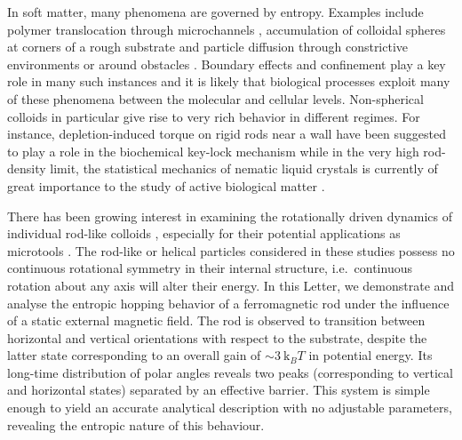 \documentclass[aps,prl,reprint,twocolumn,superscriptaddress,showpacs]{revtex4-1}
\newcommand{\kk}{\mathrm{k}_B}
\begin{document}
%
%
%
%
%
%
%
In soft matter, many phenomena are governed by entropy. Examples include polymer translocation through microchannels \cite{Muthukumar1989,Ledesma-Aguilar2012,Zhang2012}, accumulation of colloidal spheres at corners of a rough substrate \cite{Dinsmore1996} and particle diffusion through constrictive environments or around obstacles \cite{Chou1999,Zwanzig1992,Ding2015}. Boundary effects and confinement play a key role in many such instances and it is likely that biological processes exploit many of these phenomena between the molecular and cellular levels. Non-spherical colloids in particular give rise to very rich behavior in different regimes. For instance, depletion-induced torque on rigid rods near a wall have been suggested to play a role in the biochemical key-lock mechanism \cite{Roth2002,Helden2003} while in the very high rod-density limit, the statistical mechanics of nematic liquid crystals is currently of great importance to the study of active biological matter \cite{Baskaran2009,Marchetti2013}.

There has been growing interest in examining the rotationally driven dynamics of individual rod-like colloids \cite{Dhar2007,Shelton2005,Ghosh2012,Rikken2014}, especially for their potential applications as microtools \cite{Solovev2012,Xi2013}. The rod-like or helical particles considered in these studies possess no continuous rotational symmetry in their internal structure, i.e.\ continuous rotation about any axis will alter their energy. In this Letter, we demonstrate and analyse the entropic hopping behavior of a ferromagnetic rod under the influence of a static external magnetic field. The rod is observed to transition between horizontal and vertical orientations with respect to the substrate, despite the latter state corresponding to an overall gain of $\sim3\ \kk T$ in potential energy. Its long-time distribution of polar angles reveals two peaks (corresponding to vertical and horizontal states) separated by an effective barrier. This system is simple enough to yield an accurate analytical description with no adjustable parameters, revealing the entropic nature of this behaviour. 
\end{document}
